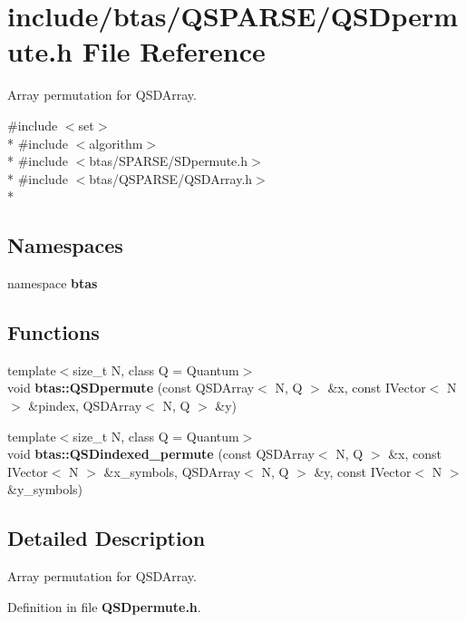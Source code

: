 \section{include/btas/\-Q\-S\-P\-A\-R\-S\-E/\-Q\-S\-Dpermute.h File Reference}
\label{d5/dc2/QSDpermute_8h}


Array permutation for Q\-S\-D\-Array.  


{\ttfamily \#include $<$set$>$}\\*
{\ttfamily \#include $<$algorithm$>$}\\*
{\ttfamily \#include $<$btas/\-S\-P\-A\-R\-S\-E/\-S\-Dpermute.\-h$>$}\\*
{\ttfamily \#include $<$btas/\-Q\-S\-P\-A\-R\-S\-E/\-Q\-S\-D\-Array.\-h$>$}\\*
\subsection*{Namespaces}
\begin{DoxyCompactItemize}
\item 
namespace {\bf btas}
\end{DoxyCompactItemize}
\subsection*{Functions}
\begin{DoxyCompactItemize}
\item 
{\footnotesize template$<$size\-\_\-t N, class Q  = Quantum$>$ }\\void {\bf btas\-::\-Q\-S\-Dpermute} (const Q\-S\-D\-Array$<$ N, Q $>$ \&x, const I\-Vector$<$ N $>$ \&pindex, Q\-S\-D\-Array$<$ N, Q $>$ \&y)
\item 
{\footnotesize template$<$size\-\_\-t N, class Q  = Quantum$>$ }\\void {\bf btas\-::\-Q\-S\-Dindexed\-\_\-permute} (const Q\-S\-D\-Array$<$ N, Q $>$ \&x, const I\-Vector$<$ N $>$ \&x\-\_\-symbols, Q\-S\-D\-Array$<$ N, Q $>$ \&y, const I\-Vector$<$ N $>$ \&y\-\_\-symbols)
\end{DoxyCompactItemize}


\subsection{Detailed Description}
Array permutation for Q\-S\-D\-Array. 

Definition in file {\bf Q\-S\-Dpermute.\-h}.

